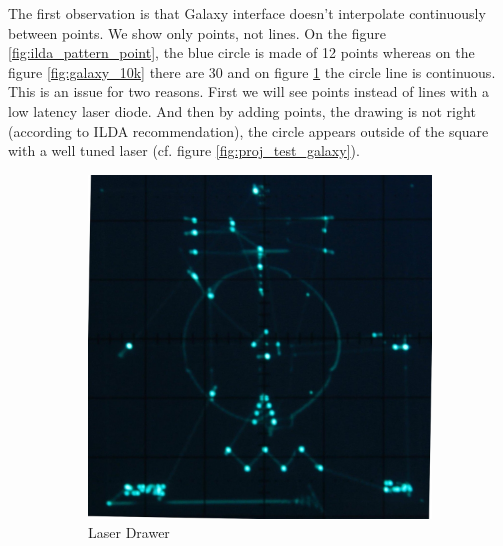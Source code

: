 \begin{en}
The first observation is that Galaxy interface doesn't interpolate continuously between points.
We show only points, not lines.
On the figure \ref{fig:ilda_pattern_point}, the blue circle is made of 12 points whereas on the figure \ref{fig:galaxy_10k} there are 30 and on figure \ref{fig:custom_10k} the circle line is continuous.
This is an issue for two reasons.
First we will see points instead of lines with a low latency laser diode.
And then by adding points, the drawing is not right (according to ILDA recommendation), the circle appears outside of the square with a well tuned laser (cf. figure \ref{fig:proj_test_galaxy}).
\end{en}


\begin{figure}[ht]
	\begin{bigcenter}
        \begin{subfigure}[b]{0.5\textwidth}
                \includegraphics[width=\textwidth]{images/comp/custom_10k.jpg}
                \caption{Laser Drawer}
                \label{fig:custom_10k}
        \end{subfigure}
        \begin{subfigure}[b]{0.5\textwidth}

\end{subfigure}
\end{bigcenter}
\end{figure}
